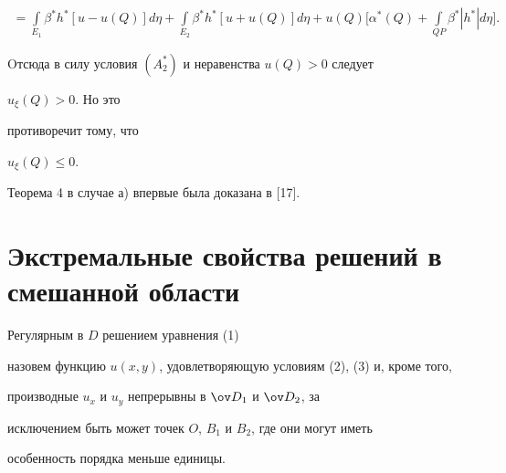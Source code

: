 \begin{pf}
\begin{multline*}
=\int\limits_{E_1}\beta^{*}h^{*}[u-u(Q)]d\eta +\int \limits_{E_2}


\beta^{*}h^{*}[u+u(Q)]d\eta +


u(Q)\bigg[\alpha^{*}(Q)+\int \limits_{QP}


\beta^{*}| h^{*}| d\eta\bigg].


\end{multline*}


Oтсюда в силу условия $(A_2^{*})$ и неравенства $u(Q)>0$ следует


$u_{\xi }(Q)>0$. Но это 


противоречит тому, что


$u_{\xi }(Q)\le 0$.


\end{pf}





\begin{note}


Теорема 4 в случае а) впервые была доказана в [17].


\end{note}





\section{Экстремальные свойства решений в смешанной области}





\begin{defn}


Регулярным в $D$ решением уравнения (1) 


назовем функцию $u(x,y)$, удовлетворяющую условиям (2), (3) и, кроме того,


производные $u_x$ и $u_y$ непрерывны в $\ov D_1$ и $\ov D_2$, за 


исключением быть может точек $O$, $B_1$ и $B_2$, где они могут иметь


особенность порядка меньше единицы.


\end{defn}






